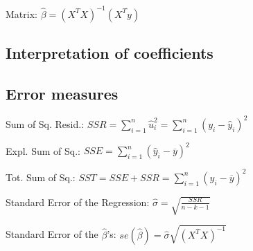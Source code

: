 \documentclass[10pt, a4paper, landscape]{extarticle}
\begin{document}
\begin{multicols}{3}
\begin{multicols}{2}
\vspace*{1mm}

Matrix: $\hat{\beta} = (X^T X)^{-1} (X^T y)$

\end{multicols}

\subsection*{Interpretation of coefficients}


\subsection*{Error measures}

Sum of Sq. Resid.: \hfill $SSR = \sum_{i=1}^n \hat{u}_i^2 = \sum_{i=1}^n (y_i - \hat{y}_i)^2$

\vspace*{0.5mm}

Expl. Sum of Sq.: \hfill $SSE = \sum_{i=1}^n (\hat{y}_i - \overline{y})^2$

\vspace*{0.5mm}

Tot. Sum of Sq.: \hfill $SST = SSE + SSR = \sum_{i=1}^n (y_i - \overline{y})^2$

\vspace*{0.5mm}

Standard Error of the Regression: \hfill $\hat{\sigma} = \sqrt{\frac{SSR}{n-k-1}}$

\vspace*{0.5mm}

Standard Error of the $\hat{\beta}$'s: \hfill $se(\hat{\beta}) = \hat{\sigma} \sqrt{(X^T X)^{-1}}$


\end{multicols}
\end{document}
